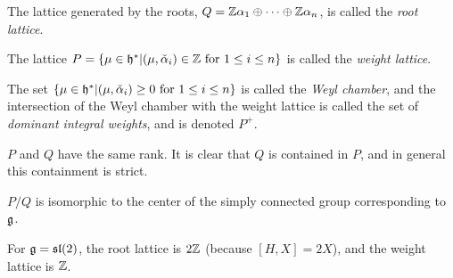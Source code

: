  \begin{definition}
   The lattice generated by the roots, $Q= \mathbb{Z}\alpha_1\oplus \cdots\oplus \mathbb{Z}
   \alpha_n$, is called the \emph{root lattice}.
 \end{definition}
 \begin{definition}
   The lattice $P=\{\mu\in \mathfrak{h}^*|(\mu,\check\alpha_i)\in \mathbb{Z}\text{ for } 1\le i\le n\}$
   is called the \emph{weight lattice}.
 \end{definition}
 \begin{definition}
   The set $\{\mu\in \mathfrak{h}^*|(\mu,\check\alpha_i)\ge 0\text{ for }1\le i\le n\}$ is
   called the \emph{Weyl chamber}, and the intersection of
   the Weyl chamber with the weight lattice is called the set of \emph{dominant
   integral weights}, and is denoted $P^+$.
 \end{definition}
 $P$ and $Q$ have the same rank. It is clear that $Q$ is contained in $P$, and in
 general this containment is strict.

 $P/Q$ is isomorphic to the center of the simply connected group corresponding to
 $\mathfrak{g}$.

%
%
 \begin{example}
   For $\mathfrak{g}=\mathfrak{sl}(2)$, the root lattice is $2\mathbb{Z}$ (because $[H,X]=2X$),
   and the weight lattice is $\mathbb{Z}$.
 \end{example}


